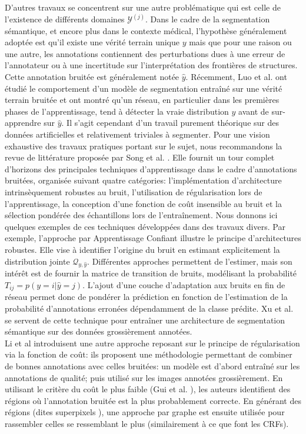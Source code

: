  D'autres travaux se concentrent sur une autre problématique qui est celle de l'existence de différents domaines $\mathcal{Y}^{(j)}$. Dans le cadre de la segmentation sémantique, et encore plus dans le contexte médical, l'hypothèse généralement adoptée est qu'il existe une vérité terrain unique $y$ mais que pour une raison ou une autre, les annotations contiennent des perturbations dues à une erreur de l'annotateur ou à une incertitude sur l'interprétation des frontières de structures. Cette annotation \og bruitée \fg est généralement notée $\hat{y}$. Récemment, Luo et al. \cite{luoDeepNeuralNetworks2022a} ont étudié le comportement d'un modèle de segmentation entraîné sur une vérité terrain bruitée et ont montré qu'un réseau, en particulier dans les premières phases de l'apprentissage, tend à détecter la vraie distribution $y$ avant de sur-apprendre sur $\hat{y}$. Il s'agit cependant d'un travail purement théorique sur des données artificielles et relativement triviales à segmenter. Pour une vision exhaustive des travaux pratiques portant sur le sujet, nous recommandons la revue de littérature proposée par Song et al. \cite{songLearningNoisyLabels2022}. Elle fournit un tour complet d'horizons des principales techniques d'apprentissage dans le cadre d'annotations bruitées, organisée suivant quatre catégories: l'implémentation d'architecture intrinsèquement robustes au bruit, l'utilisation de régularisation lors de l'apprentissage, la conception d'une fonction de coût insensible au bruit et la sélection pondérée des échantillons lors de l'entraînement. Nous donnons ici quelques exemples de ces techniques développées dans des travaux divers.
 Par exemple, l'approche par \og Apprentissage Confiant \fg \cite{zhangCharacterizingLabelErrors2020} illustre le principe d'architectures robustes. Elle vise à identifier l'origine du bruit en estimant explicitement la distribution jointe $\mathcal{Q}_{y, \hat{y}}$. Différentes approches permettent de l'estimer, mais son intérêt est de fournir la matrice de transition de bruits, modélisant la probabilité $T_{ij}=p(y=i | \hat{y}=j)$. L'ajout d'une couche d'adaptation aux bruits en fin de réseau permet donc de pondérer la prédiction en fonction de l'estimation de la probabilité d'annotations erronées dépendamment de la classe prédite. Xu et al. \cite{xuNoisyLabelsAre2021} se servent de cette technique pour entraîner une architecture de segmentation sémantique sur des données grossièrement annotées.
 \\
 Li et al \cite{yiLearningPixelLevelLabel2022} introduisent une autre approche reposant sur le principe de régularisation via la fonction de coût: ils proposent une méthodologie permettant de combiner de bonnes annotations avec celles bruitées: un modèle est d'abord entraîné sur les annotations de qualité; puis utilisé sur les images annotées grossièrement. En utilisant le critère du coût le plus faible (Gui et al. \cite{guiUnderstandingDeepLearning2021}), les auteurs identifient des régions où l'annotation bruitée est la plus probablement correcte. En générant des régions (dites \og superpixels \fg), une approche par graphe est ensuite utilisée pour rassembler celles se ressemblant le plus (similairement à ce que font les CRFs).

